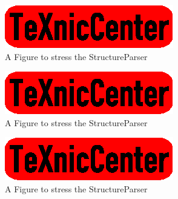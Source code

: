 %

%
%
%
%


\begin{figure}
	\begin{center}
		\includegraphics{txc.eps}
	\end{center}
	\caption{A Figure to stress the StructureParser}
\end{figure}

\begin{figure}
	\begin{center}
		\includegraphics{txc.eps}
	\end{center}
	\caption{A Figure to stress the StructureParser}
\end{figure}

\begin{figure}
	\begin{center}
		\includegraphics{txc.eps}
	\end{center}
	\caption{A Figure to stress the StructureParser}
\end{figure}

